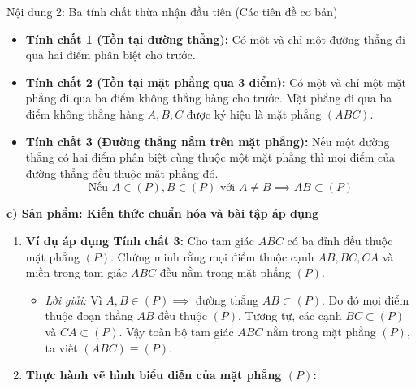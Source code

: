 \documentclass[12pt, a4paper]{article}
\begin{document}
\begin{pedabox}{Nội dung 2: Ba tính chất thừa nhận đầu tiên (Các tiên đề cơ bản)}
\begin{itemize}[leftmargin=0.6cm]
    \item \textbf{Tính chất 1 (Tồn tại đường thẳng):} Có một và chỉ một đường thẳng đi qua hai điểm phân biệt cho trước.
    \item \textbf{Tính chất 2 (Tồn tại mặt phẳng qua 3 điểm):} Có một và chỉ một mặt phẳng đi qua ba điểm không thẳng hàng cho trước. Mặt phẳng đi qua ba điểm không thẳng hàng $A, B, C$ được ký hiệu là mặt phẳng $(ABC)$.
    \item \textbf{Tính chất 3 (Đường thẳng nằm trên mặt phẳng):} Nếu một đường thẳng có hai điểm phân biệt cùng thuộc một mặt phẳng thì mọi điểm của đường thẳng đều thuộc mặt phẳng đó.
    $$\text{Nếu } A \in (P), B \in (P) \text{ với } A \neq B \implies AB \subset (P)$$
\end{itemize}
\end{pedabox}

\noindent \textbf{c) Sản phẩm: Kiến thức chuẩn hóa và bài tập áp dụng}
\begin{enumerate}[leftmargin=0.6cm]
    \item \textbf{Ví dụ áp dụng Tính chất 3:} Cho tam giác $ABC$ có ba đỉnh đều thuộc mặt phẳng $(P)$. Chứng minh rằng mọi điểm thuộc cạnh $AB, BC, CA$ và miền trong tam giác $ABC$ đều nằm trong mặt phẳng $(P)$.
    \begin{itemize}
        \item \textit{Lời giải:} Vì $A, B \in (P) \implies$ đường thẳng $AB \subset (P)$. Do đó mọi điểm thuộc đoạn thẳng $AB$ đều thuộc $(P)$. Tương tự, các cạnh $BC \subset (P)$ và $CA \subset (P)$. Vậy toàn bộ tam giác $ABC$ nằm trong mặt phẳng $(P)$, ta viết $(ABC) \equiv (P)$.
    \end{itemize}
    \item \textbf{Thực hành vẽ hình biểu diễn của mặt phẳng $(P)$:}
    \begin{center}
    \end{center}
\end{enumerate}
\end{document}
